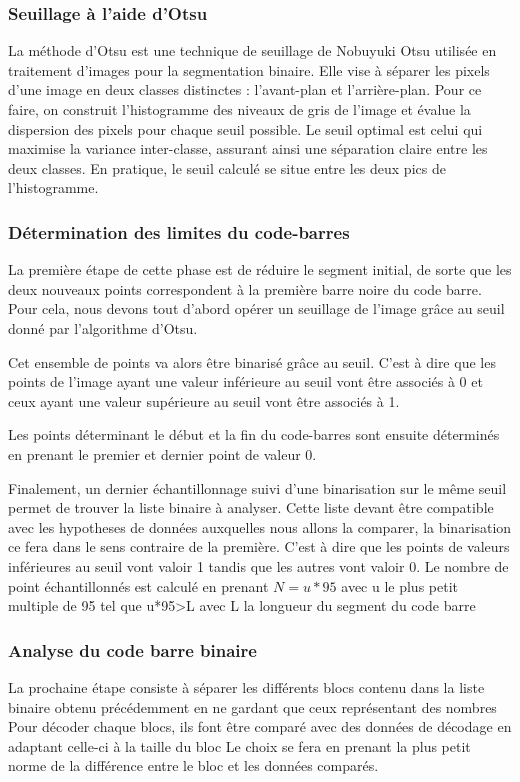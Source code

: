 \documentclass{rapport}
\begin{document}
\subsubsection*{Seuillage à l'aide d'Otsu}
La méthode d'Otsu est une technique de seuillage de Nobuyuki Otsu utilisée en traitement d'images pour la segmentation binaire. 
Elle vise à séparer les pixels d'une image en deux classes distinctes : l'avant-plan et l'arrière-plan. 
Pour ce faire, on construit l'histogramme des niveaux de gris de l'image et évalue la dispersion des pixels pour chaque seuil possible. 
Le seuil optimal est celui qui maximise la variance inter-classe, assurant ainsi une séparation claire entre les deux classes. 
En pratique, le seuil calculé se situe entre les deux pics de l'histogramme.

\subsubsection*{Détermination des limites du code-barres}
La première étape de cette phase est de réduire le segment initial, de sorte que les deux nouveaux points correspondent à la première barre noire du code barre.
Pour cela, nous devons tout d'abord opérer un seuillage de l'image grâce au seuil donné par l'algorithme d'Otsu.

Cet ensemble de points va alors être binarisé grâce au seuil. C'est à dire que les points de l'image ayant une valeur inférieure au seuil vont être associés à 0 et ceux ayant une valeur supérieure au seuil vont être associés à 1.

Les points déterminant le début et la fin du code-barres sont ensuite déterminés en prenant le premier et dernier point de valeur 0.

Finalement, un dernier échantillonnage suivi d'une binarisation sur le même seuil permet de trouver la liste binaire à analyser. Cette liste devant être compatible avec les hypotheses de données auxquelles nous allons la comparer, la binarisation ce fera dans le sens contraire de la première.
C'est à dire que les points de valeurs inférieures au seuil vont valoir 1 tandis que les autres vont valoir 0.
Le nombre de point échantillonnés est calculé en prenant $N=u*95$ avec u le plus petit multiple de 95 tel que u*95>L avec L la longueur du segment du code barre

\subsubsection*{Analyse du code barre binaire}
La prochaine étape consiste à séparer les différents blocs contenu dans la liste binaire obtenu précédemment en ne gardant que ceux représentant des nombres
Pour décoder chaque blocs, ils font être comparé avec des données de décodage en adaptant celle-ci à la taille du bloc 
Le choix se fera en prenant la plus petit norme de la différence entre le bloc et les données comparés.
\end{document}

